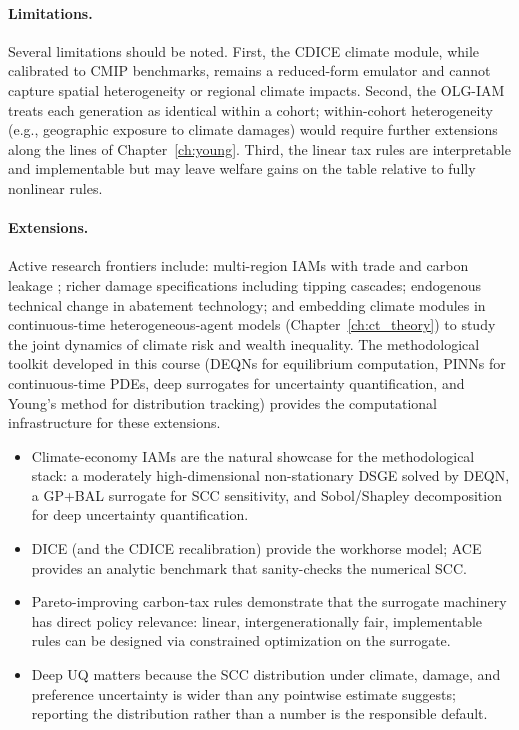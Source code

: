 \documentclass[11pt,a4paper]{report}
\begin{document}
\paragraph{Limitations.}
Several limitations should be noted.  First, the CDICE climate module, while calibrated to CMIP benchmarks, remains a reduced-form emulator and cannot capture spatial heterogeneity or regional climate impacts.  Second, the OLG-IAM treats each generation as identical within a cohort; within-cohort heterogeneity (e.g., geographic exposure to climate damages) would require further extensions along the lines of Chapter~\ref{ch:young}.  Third, the linear tax rules are interpretable and implementable but may leave welfare gains on the table relative to fully nonlinear rules.

\paragraph{Extensions.}
Active research frontiers include: multi-region IAMs with trade and carbon leakage \citep{nordhaus1996regional}; richer damage specifications including tipping cascades; endogenous technical change in abatement technology; and embedding climate modules in continuous-time heterogeneous-agent models (Chapter~\ref{ch:ct_theory}) to study the joint dynamics of climate risk and wealth inequality.  The methodological toolkit developed in this course (DEQNs for equilibrium computation, PINNs for continuous-time PDEs, deep surrogates for uncertainty quantification, and Young's method for distribution tracking) provides the computational infrastructure for these extensions.

\begin{keyinsightbox}
\begin{itemize}[itemsep=2pt, leftmargin=*]
\item Climate-economy IAMs are the natural showcase for the methodological stack: a moderately high-dimensional non-stationary DSGE solved by DEQN, a GP+BAL surrogate for SCC sensitivity, and Sobol/Shapley decomposition for deep uncertainty quantification.
\item DICE (and the CDICE recalibration) provide the workhorse model; ACE provides an analytic benchmark that sanity-checks the numerical SCC.
\item Pareto-improving carbon-tax rules \citep{kotlikoff2021making, kubler2025using} demonstrate that the surrogate machinery has direct policy relevance: linear, intergenerationally fair, implementable rules can be designed via constrained optimization on the surrogate.
\item Deep UQ matters because the SCC distribution under climate, damage, and preference uncertainty is wider than any pointwise estimate suggests; reporting the distribution rather than a number is the responsible default.
\end{itemize}
\end{keyinsightbox}
\end{document}
